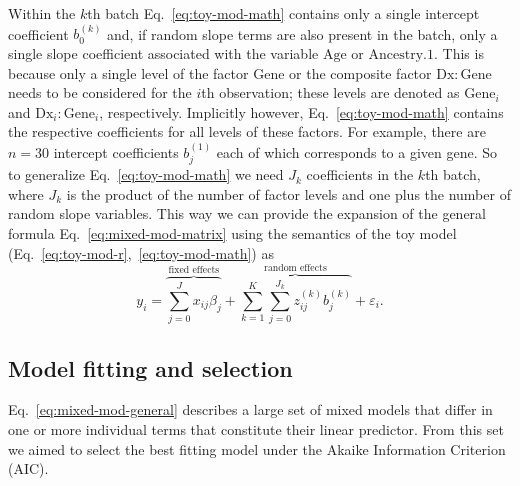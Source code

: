 \documentclass[letterpaper]{article}
\begin{document}
Within the \(k\)th batch Eq.~\ref{eq:toy-mod-math} contains only a single
intercept coefficient \(b_0^{(k)}\) and, if random slope terms are also
present in the batch, only a single slope coefficient associated with the
variable \(\mathrm{Age}\) or \(\mathrm{Ancestry.1}\).  This is because only a
single level of the factor \(\mathrm{Gene}\) or the composite factor
\(\mathrm{Dx}:\mathrm{Gene}\) needs to be considered for the \(i\)th
observation; these levels are denoted as \(\mathrm{Gene}_i\) and
\(\mathrm{Dx}_i:\mathrm{Gene}_i\), respectively.  Implicitly however,
Eq.~\ref{eq:toy-mod-math} contains the respective coefficients for all levels
of these factors.  For example, there are \(n=30\) intercept coefficients
\(b_j^{(1)}\) each of which corresponds to a given gene.  So to generalize
Eq.~\ref{eq:toy-mod-math} we need \(J_k\) coefficients in the \(k\)th batch,
where \(J_k\) is the product of the number of factor levels and one plus the
number of random slope variables.  This way we can provide the expansion of
the general formula Eq.~\ref{eq:mixed-mod-matrix} using the semantics of the
toy model (Eq.~\ref{eq:toy-mod-r},~\ref{eq:toy-mod-math}) as
\begin{equation}
y_i = \overbrace{\sum_{j=0}^J x_{ij} \beta_j}^{\text{fixed effects}} +
\overbrace{\sum_{k=1}^K \sum_{j=0}^{J_k} z_{ij}^{(k)}
b_{j}^{(k)}}^{\text{random effects}} + \varepsilon_i.
\label{eq:mixed-mod-general}
\end{equation}

\subsection{Model fitting and selection}
\label{sec:fitting}

Eq.~\ref{eq:mixed-mod-general} describes a large set of mixed models that
differ in one or more individual terms that constitute their linear predictor.
From this set we aimed to select the best fitting model under the Akaike
Information Criterion (AIC).
\end{document}
